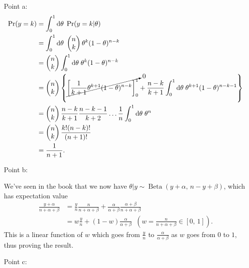 \documentclass{article}
\newcommand\oname\operatorname
\begin{document}
Point a:
\begin{align*}
	\oname{Pr}(y=k)&=\int_0^1\mathrm d\theta\;\oname{Pr}(y=k|\theta)\\
	&=\int_0^1\mathrm d\theta\;\begin{pmatrix}n\\k\end{pmatrix}\theta^k(1-\theta)^{n-k}\\
	&=\begin{pmatrix}n\\k\end{pmatrix}\int_0^1\mathrm d\theta\;\theta^k(1-\theta)^{n-k}\\
	&=\begin{pmatrix}n\\k\end{pmatrix}\left\{\cancelto{0}{\left[\frac1{k+1}\theta^{k+1}(1-\theta)^{n-k}\right]_0^1}+\frac{n-k}{k+1}\int_0^1\mathrm d\theta\;\theta^{k+1}(1-\theta)^{n-k-1}\right\}\\
	&=\begin{pmatrix}n\\k\end{pmatrix}\frac{n-k}{k+1}\frac{n-k-1}{k+2}\ldots\frac{1}{n}\int_0^1\mathrm d\theta\;\theta^n\\
	&=\begin{pmatrix}n\\k\end{pmatrix}\frac{k!(n-k)!}{(n+1)!}\\
	&=\frac{1}{n+1}.
\end{align*}

Point b:

We've seen in the book that we now have $\theta|y\sim\oname{Beta}(y+\alpha,\,n-y+\beta)$, which has expectation value
\begin{align*}
	\frac{y+\alpha}{n+\alpha+\beta}&=\frac{y}{n}\frac{n}{n+\alpha+\beta}+\frac\alpha{\alpha+\beta}\frac{\alpha+\beta}{n+\alpha+\beta}\\
	&=w\frac{y}n+(1-w)\frac\alpha{\alpha+\beta}\;\;\left(w=\frac{n}{n+\alpha+\beta}\in[0,\,1]\right).
\end{align*}
This is a linear function of $w$ which goes from $\frac{y}n$ to $\frac\alpha{\alpha+\beta}$ as $w$ goes from $0$ to $1$, thus proving the result.

Point c:
\end{document}
